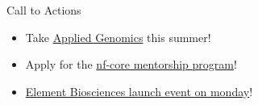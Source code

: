 \documentclass[bigger]{beamer}
\begin{document}
\begin{frame}[label={sec:org2871916}]{Call to Actions}
\begin{itemize}
\item Take \href{https://functional-genomics-lab.github.io/Applied-Genomics/}{\alert{Applied Genomics}} this summer!
\item Apply for the \href{https://nf-co.re/mentorships}{\alert{nf-core mentorship program}}!
\item \href{https://registration.elementbiosciences.com/}{\alert{Element Biosciences launch event on monday}}!
\end{itemize}
\end{frame}
\end{document}
